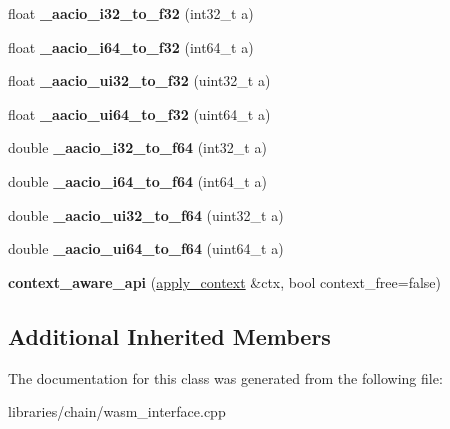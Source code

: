 \begin{DoxyCompactItemize}
float {\bfseries \+\_\+aacio\+\_\+i32\+\_\+to\+\_\+f32} (int32\+\_\+t a)
\item 
\mbox{\label{classaacio_1_1chain_1_1softfloat__api_aee044ed19bc4cac1962e4aa330af952b}} 
float {\bfseries \+\_\+aacio\+\_\+i64\+\_\+to\+\_\+f32} (int64\+\_\+t a)
\item 
\mbox{\label{classaacio_1_1chain_1_1softfloat__api_a51b5b29dab8fb79cabe69d92bc3dd3b7}} 
float {\bfseries \+\_\+aacio\+\_\+ui32\+\_\+to\+\_\+f32} (uint32\+\_\+t a)
\item 
\mbox{\label{classaacio_1_1chain_1_1softfloat__api_a9423d12da1c6a064c5e2901f26b0ba8b}} 
float {\bfseries \+\_\+aacio\+\_\+ui64\+\_\+to\+\_\+f32} (uint64\+\_\+t a)
\item 
\mbox{\label{classaacio_1_1chain_1_1softfloat__api_a239dcee43f2bfc554e222558c0e7e8c9}} 
double {\bfseries \+\_\+aacio\+\_\+i32\+\_\+to\+\_\+f64} (int32\+\_\+t a)
\item 
\mbox{\label{classaacio_1_1chain_1_1softfloat__api_a463d7539e7a5506699aa9e77bbc05457}} 
double {\bfseries \+\_\+aacio\+\_\+i64\+\_\+to\+\_\+f64} (int64\+\_\+t a)
\item 
\mbox{\label{classaacio_1_1chain_1_1softfloat__api_aba6b0eb66d441a6b1dba8b68367104cc}} 
double {\bfseries \+\_\+aacio\+\_\+ui32\+\_\+to\+\_\+f64} (uint32\+\_\+t a)
\item 
\mbox{\label{classaacio_1_1chain_1_1softfloat__api_adaec222b0328bad01f5dbb2c011ad938}} 
double {\bfseries \+\_\+aacio\+\_\+ui64\+\_\+to\+\_\+f64} (uint64\+\_\+t a)
\item 
\mbox{\label{classaacio_1_1chain_1_1softfloat__api_ad2711b0a72fe3f1b0b1512c97e16d285}} 
{\bfseries context\+\_\+aware\+\_\+api} (\mbox{\hyperlink{classaacio_1_1chain_1_1apply__context}{apply\+\_\+context}} \&ctx, bool context\+\_\+free=false)
\end{DoxyCompactItemize}
\subsection*{Additional Inherited Members}


The documentation for this class was generated from the following file\+:\begin{DoxyCompactItemize}
\item 
libraries/chain/wasm\+\_\+interface.\+cpp\end{DoxyCompactItemize}
